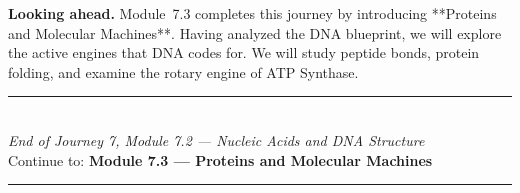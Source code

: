 \documentclass[12pt, a4paper]{book}
\begin{document}
\medskip
\noindent\textbf{Looking ahead.}
Module~7.3 completes this journey by introducing **Proteins and Molecular Machines**. Having analyzed the DNA blueprint, we will explore the active engines that DNA codes for. We will study peptide bonds, protein folding, and examine the rotary engine of ATP Synthase.

\vspace{1.4cm}
\begin{center}
{\color{JourneyColor}\rule{0.5\linewidth}{0.8pt}}\\[6pt]
{\small\color{JourneyColor}\textit{End of Journey 7, Module 7.2 --- Nucleic Acids and DNA Structure}}\\[4pt]
{\small\color{JourneyColor}Continue to: \textbf{Module 7.3 --- Proteins and Molecular Machines}}\\[6pt]
{\color{JourneyColor}\rule{0.5\linewidth}{0.8pt}}
\end{center}
\end{document}
